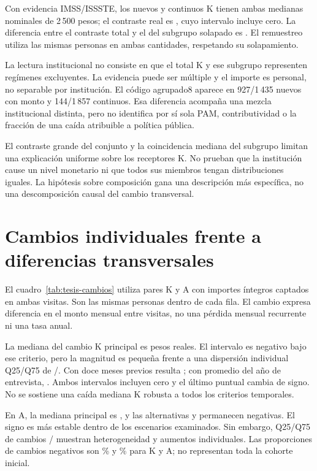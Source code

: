 Con evidencia IMSS/ISSSTE, los nuevos y continuos K tienen ambas medianas
nominales de 2\,500 pesos; el contraste real es
, cuyo intervalo incluye cero.
La diferencia entre el contraste total y el del subgrupo solapado es
. El remuestreo utiliza las mismas personas
en ambas cantidades, respetando su solapamiento.

La lectura institucional no consiste en que el total K y ese subgrupo
representen regímenes excluyentes. La evidencia puede ser múltiple y el
importe es personal, no separable por institución. El código agrupado8
aparece en 927/1\,435 nuevos con monto y 144/1\,857 continuos.
Esa diferencia acompaña una mezcla institucional distinta, pero no identifica
por sí sola PAM, contributividad o la fracción de una caída atribuible
a política pública.

El contraste grande del conjunto y la coincidencia mediana del subgrupo
limitan una explicación uniforme sobre los receptores K. No prueban que
la institución cause un nivel monetario ni que todos sus miembros tengan
distribuciones iguales. La hipótesis sobre composición gana una descripción
más específica, no una descomposición causal del cambio transversal.

\section{Cambios individuales frente a diferencias transversales}
\label{sec:resultados-cambios}

El cuadro~\ref{tab:tesis-cambios} utiliza  pares K y
 A con importes íntegros captados en ambas visitas.
Son las mismas personas dentro de cada fila. El cambio expresa diferencia
en el monto mensual entre visitas, no una pérdida mensual recurrente ni
una tasa anual.


\FloatBarrier

La mediana del cambio K principal es  pesos reales.
El intervalo es negativo bajo ese criterio, pero la magnitud es pequeña
frente a una dispersión individual Q25/Q75 de
/.
Con doce meses previos resulta ; con promedio del
año de entrevista, . Ambos intervalos incluyen cero
y el último puntual cambia de signo. No se sostiene una caída mediana K
robusta a todos los criterios temporales.

En A, la mediana principal es , y las alternativas
 y  permanecen negativas.
El signo es más estable dentro de los escenarios examinados.
Sin embargo, Q25/Q75 de cambios
/ muestran heterogeneidad y
aumentos individuales. Las proporciones de cambios negativos son
\% y \% para K y A;
no representan toda la cohorte inicial.

